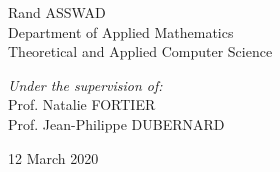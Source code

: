 \documentclass[american,]{article}
\begin{document}
\begin{titlepage}
\begin{sffamily}
\begin{center}
            \begin{minipage}{0.45\textwidth}
            \begin{flushleft} \large
                Rand ASSWAD\\
                Department of Applied Mathematics\\
                Theoretical and Applied Computer Science
            \end{flushleft}
            \end{minipage}
            \begin{minipage}{0.45\textwidth}
            \begin{flushright} \large
                \emph{Under the supervision of:}\\
                Prof. Natalie FORTIER\\
                Prof. Jean-Philippe DUBERNARD
            \end{flushright}
            \end{minipage}

            \vfill
            {\large 12 March 2020}
        \end{center}
    \end{sffamily}
\end{titlepage}
\makeatother

{
\setcounter{tocdepth}{3}
\tableofcontents
}
\def\R{\mathbb{R}}
\def\C{\mathbb{C}}
\def\N{\mathbb{N}}
\def\Z{\mathbb{Z}}

\def\x{\tilde{x}}
\def\w{\omega}
\def\phi{\varphi}

\def\dt{\mathrm{d}t}

\def\pp#1{\left(#1\right)}
\def\sset#1{\left\{#1\right\}}
\def\vset#1#2{\sset{#1\left\lvert#2\right.}}

\def\abs #1{\left\lvert#1\right\rvert}
\def\norm#1{\left\lVert#1\right\rVert}
\def\dotp#1#2{\left\langle#1{;}#2\right\rangle}

\def\pmat#1{\begin{pmatrix}#1\end{pmatrix}}

\def\qtext#1{\quad\text{#1}\quad}

\def\argmin{\mathop{\mathrm{argmin}}}
\def\argmax{\mathop{\mathrm{argmax}}}
\def\supp{\mathop{\mathrm{supp}}}

\def\transp#1{{#1}^{\top}}

\def\f{\boldsymbol{f}}
\def\ff{\f\hspace{-2pt}\f}
\def\mf{\boldsymbol{mf}}
\def\mp{\boldsymbol{mp}}
\def\p{\boldsymbol{p}}
\def\piu{pi\grave{u}~}
\end{document}

